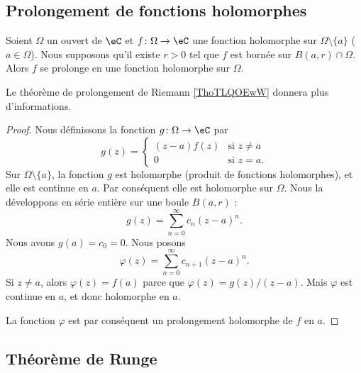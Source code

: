 \subsection{Prolongement de fonctions holomorphes}

\begin{proposition} \label{PropDRnYkKP}
    Soient \( \Omega\) un ouvert de \( \eC\) et \( f\colon \Omega\to \eC\) une fonction holomorphe sur \( \Omega\setminus\{ a \}\) (\( a\in \Omega\)). Nous supposons qu'il existe \( r>0\) tel que \( f\) est bornée sur \( B(a,r)\cap\Omega\). Alors \( f\) se prolonge en une fonction holomorphe sur \( \Omega\).
\end{proposition}
Le théorème de prolongement de Riemann \ref{ThoTLQOEwW} donnera plus d'informations.

\begin{proof}
    Nous définissons la fonction \( g\colon \Omega\to \eC\) par
    \begin{equation}
        g(z)=\begin{cases}
            (z-a)f(z)    &   \text{si } z\neq a\\
            0    &    \text{si } z=a.
        \end{cases}
    \end{equation}
    Sur \( \Omega\setminus\{ a \}\), la fonction \( g\) est holomorphe (produit de fonctions holomorphes), et elle est continue en \( a\). Par conséquent elle est holomorphe sur \( \Omega\). Nous la développons en série entière sur une boule \( B(a,r)\) :
    \begin{equation}
        g(z)=\sum_{n=0}^{\infty}c_n(z-a)^n.
    \end{equation}
    Nous avons \( g(a)=c_0=0\). Nous posons
    \begin{equation}
        \varphi(z)=\sum_{n=0}^{\infty}c_{n+1}(z-a)^n.
    \end{equation}
    Si \( z\neq a\), alors \( \varphi(z)=f(a)\) parce que \( \varphi(z)=g(z)/(z-a)\). Mais \( \varphi\) est continue en \( a\), et donc holomorphe en \( a\).

    La fonction \( \varphi\) est par conséquent un prolongement holomorphe de \( f\) en \( a\).
\end{proof}

\subsection{Théorème de Runge}


